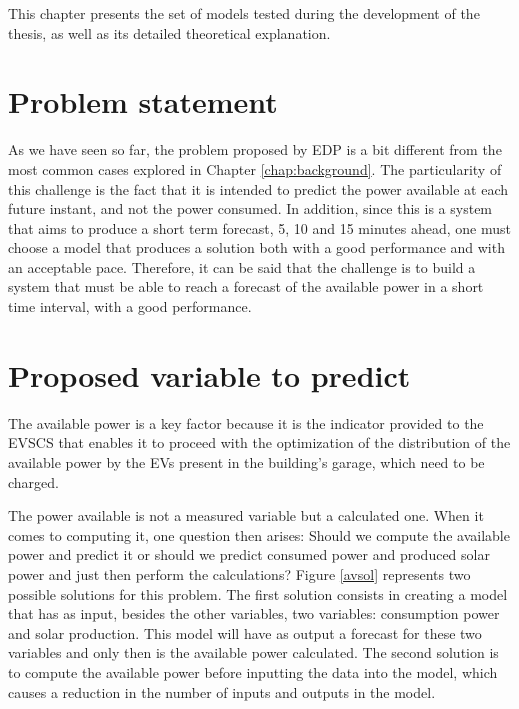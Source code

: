 \cleardoublepage
\label{chap:Model}

This chapter presents the set of models tested during the development of the thesis, as well as its detailed theoretical explanation.

\section{Problem statement} \label{chap4:ps}

As we have seen so far, the problem proposed by \ac{EDP} is a bit different from the most common cases explored in Chapter \ref{chap:background}. The particularity of this challenge is the fact that it is intended to predict the power available at each future instant, and not the power consumed. In addition, since this is a system that aims to produce a short term forecast, 5, 10 and 15 minutes ahead, one must choose a model that produces a solution both with a good performance and with an acceptable pace. Therefore, it can be said that the challenge is to build a system that must be able to reach a forecast of the available power in a short time interval, with a good performance.


\section{Proposed variable to predict}\label{chap4:vtp}

The available power is a key factor because it is the indicator provided to the \ac{EVSCS} that enables it to proceed with the optimization of the distribution of the available power by the \ac{EV}s present in the building's garage, which need to be charged.

The power available is not a measured variable but a calculated one. When it comes to computing it, one question then arises: Should we compute the available power and predict it or should we predict consumed power and produced solar power and just then perform the calculations? Figure \ref{avsol} represents two possible solutions for this problem. The first solution consists in creating a model that has as input, besides the other variables, two variables: consumption power and solar production. This model will have as output a forecast for these two variables and only then is the available power calculated. The second solution is to compute the available power before inputting the data into the model, which causes a reduction in the number of inputs and outputs in the model. 

